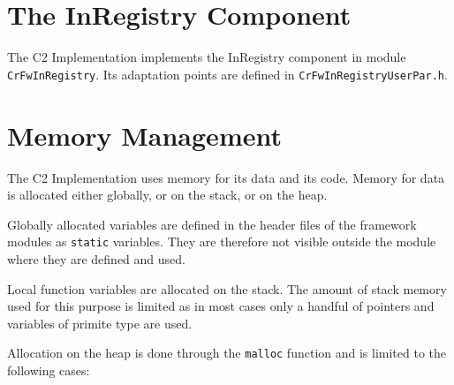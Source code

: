 \documentclass{pnp_article}
\begin{document}
\section{The InRegistry Component}\label{sec:InRegistry}


The C2 Implementation implements the InRegistry component in module \texttt{CrFwInRegistry}. Its adaptation points are defined in \texttt{CrFwInRegistryUserPar.h}.


\section{Memory Management}\label{sec:MemMng}

The C2 Implementation uses memory for its data and its code. Memory for data is allocated either globally, or on the stack, or on the heap.

Globally allocated variables are defined in the header files of the framework modules as \texttt{static} variables. They are therefore not visible outside the module where they are defined and used.

Local function variables are allocated on the stack. The amount of stack memory used for this purpose is limited as in most cases only a handful of pointers and variables of primite type are used.

Allocation on the heap is done through the \texttt{malloc} function and is limited to the following cases:
\end{document}

